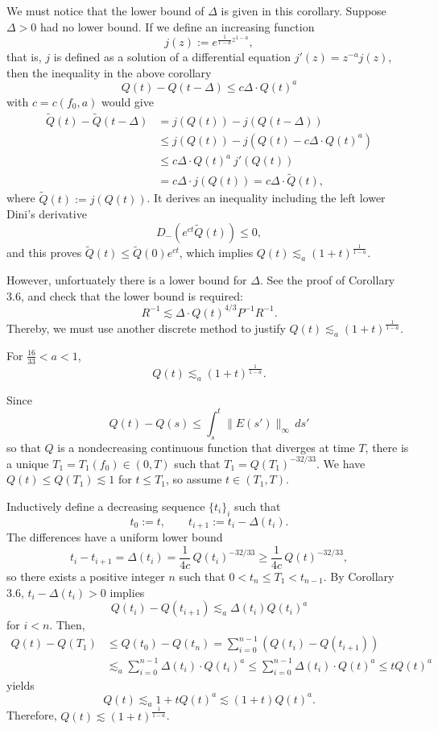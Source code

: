 \documentclass[12pt]{article}
\begin{document}
\begin{rmk}
We must notice that the lower bound of $\Delta$ is given in this corollary.
Suppose $\Delta>0$ had no lower bound.
If we define an increasing function
\[j(z):=e^{\frac1{1-a}z^{1-a}},\]
that is, $j$ is defined as a solution of a differential equation $j'(z)=z^{-a}j(z)$, then the inequality in the above corollary
\[Q(t)-Q(t-\Delta)\le c\Delta\cdot Q(t)^a\]
with $c=c(f_0,a)$ would give
\begin{align*}
\tilde Q(t)-\tilde Q(t-\Delta)
&=j(Q(t))-j(Q(t-\Delta))\\
&\le j(Q(t))-j(Q(t)-c\Delta\cdot Q(t)^a)\\
&\le c\Delta\cdot Q(t)^a\ j'(Q(t))\\
&=c\Delta\cdot j(Q(t))=c\Delta\cdot\tilde Q(t),
\end{align*}
where $\tilde Q(t):=j(Q(t))$.
It derives an inequality including the left lower Dini's derivative
\[D_-(e^{ct}\tilde Q(t))\le0,\]
and this proves $\tilde Q(t)\le\tilde Q(0)e^{ct}$, which implies $Q(t)\lesssim_a(1+t)^{\frac1{1-a}}$.

However, unfortuately there is a lower bound for $\Delta$.
See the proof of Corollary 3.6, and check that the lower bound is required:
\[R^{-1}\lesssim\Delta\cdot Q(t)^{4/3}P^{-1}R^{-1}.\]
Thereby, we must use another discrete method to justify $Q(t)\lesssim_a(1+t)^{\frac1{1-a}}$.
\end{rmk}

\begin{thm*}
For $\frac{16}{33}<a<1$,
\[Q(t)\lesssim_a(1+t)^{\frac1{1-a}}.\]
\end{thm*}
\begin{pf}
Since
\[Q(t)-Q(s)\le\int_s^t\|E(s')\|_\infty\,ds'\]
so that $Q$ is a nondecreasing continuous function that diverges at time $T$, there is a unique $T_1=T_1(f_0)\in(0,T)$ such that $T_1=Q(T_1)^{-32/33}$.
We have $Q(t)\le Q(T_1)\lesssim1$ for $t\le T_1$, so assume $t\in(T_1,T)$.

Inductively define a decreasing sequence $\{t_i\}_i$ such that
\[t_0:=t,\qquad t_{i+1}:=t_i-\Delta(t_i).\]
The differences have a uniform lower bound
\[t_i-t_{i+1}=\Delta(t_i)=\frac1{4c}\,Q(t_i)^{-32/33}\ge\frac1{4c}\,Q(t)^{-32/33},\]
so there exists a positive integer $n$ such that $0<t_n\le T_1<t_{n-1}$.
By Corollary 3.6, $t_i-\Delta(t_i)>0$ implies
\[Q(t_i)-Q(t_{i+1})\lesssim_a\Delta(t_i)Q(t_i)^a\]
for $i<n$.
Then,
\begin{align*}
Q(t)-Q(T_1)&\le Q(t_0)-Q(t_n)
=\sum_{i=0}^{n-1}(Q(t_i)-Q(t_{i+1}))\\
&\lesssim_a\sum_{i=0}^{n-1}\Delta(t_i)\cdot Q(t_i)^a
\le\sum_{i=0}^{n-1}\Delta(t_i)\cdot Q(t)^a
\le tQ(t)^a
\end{align*}
yields
\[Q(t)\lesssim_a1+tQ(t)^a\lesssim(1+t)Q(t)^a.\]
Therefore, $Q(t)\lesssim(1+t)^{\frac1{1-a}}$.
\end{pf}




\end{document}
